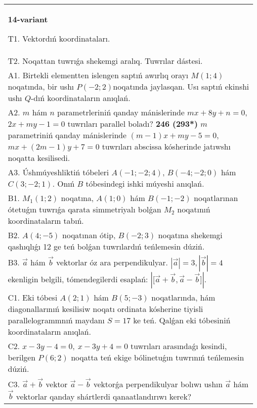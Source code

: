 \documentclass{article}
\begin{document}
\begin{tabular}{m{17cm}}
\textbf{14-variant}
\newline

T1. 
Vektordıń koordinataları.
 \\
T2. 
Noqattan tuwrıǵa shekemgi aralıq. Tuwrılar dástesi.
 \\
A1. 
Birtekli elementten islengen saptıń awırlıq orayı
$M(1;4)$ noqatında, bir ushı $P(-2;2)$noqatında jaylasqan. Usı
saptıń ekinshi ushı $Q$-dıń koordinataların anıqlań.
 \\
A2. 
$m$ hám $n$ parametrleriniń qanday mánislerinde
$mx+8y+n=0$, $2x+my-1=0$ tuwrıları parallel boladı?
\textbf{246 (293*)} $m$ parametriniń qanday mánislerinde 
$(m-1)x+my-5=0$, $mx+(2m-1)y+7=0$ tuwrıları abscissa
kósherinde jatıwshı noqatta kesilisedi.
 \\
A3. 
Úshmúyeshliktiń tóbeleri
$A (- 1; - 2;4) $, $B (- 4; - 2;0) $ hám $C (3; - 2;1) $. Onıń $B$ tóbesindegi
ishki múyeshi anıqlań. 
 \\
B1. 
\(M_{1}(1;2)\) noqatına, \(A(1;0)\) hám \(B(-1;-2)\)
noqatlarınan ótetuǵın tuwrıǵa qarata simmetriyalı bolǵan \(M_{2}\) noqatınıń koordinataların tabıń.
 \\
B2. 
\(A(4;-5)\) noqatınan ótip, \(B(-2;3)\) noqatına
shekemgi qashıqlıǵı 12 ge teń bolǵan tuwrılardıń teńlemesin dúziń.
 \\
B3. 
$\vec{a}$ hám $\vec{b}$ vektorlar óz ara perpendikulyar. $|\vec{a}| = 3,|\vec{b}| = 4$ ekenligin belgili, tómendegilerdi esaplań: 
$|\lbrack\vec{a} + \vec{b},\vec{a} - \vec{b}\rbrack|$. 
 \\
C1. 
Eki tóbesi \(A(2;1)\) hám \(B(5; - 3)\) noqatlarında, hám
diagonallarınıń kesilisiw noqatı ordinata kósherine tiyisli
parallelogrammnıń maydanı \(S = 17\) ke teń. Qalǵan eki tóbesiniń
koordinataların anıqlań. \\
C2. 
\(x - 3y - 4 = 0,\ x - 3y + 4 = 0\) tuwrıları
arasındaǵı kesindi, berilgen \(P(6;2)\) noqatta teń ekige bólinetuǵın
tuwrınıń teńlemesin dúziń.
 \\
C3. 
\(\vec{a} + \vec{b}\) vektor \(\vec{a} - \vec{b}\) vektorǵa perpendikulyar bolıwı ushın \(\vec{a}\) hám \(\vec{b}\) vektorlar qanday shártlerdi qanaatlandırıwı kerek?
 \\

\end{tabular}
\vspace{1cm}
\end{document}

